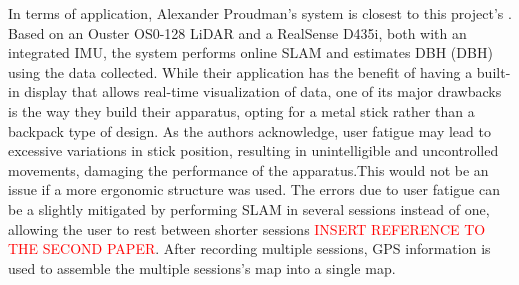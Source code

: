 In terms of application, Alexander Proudman's system is closest to this project's \cite{proudman_online_2021}. Based on an Ouster OS0-128 \acs{LiDAR} and a RealSense D435i, both with an integrated \acs{IMU}, the system performs online \acs{SLAM} and estimates \acl{DBH} (\acs*{DBH}) using the data collected. While their application has the benefit of having a built-in display that allows real-time visualization of data, one of its major drawbacks is the way they build their apparatus, opting for a metal stick rather than a backpack type of design. As the authors acknowledge, user fatigue may lead to excessive variations in stick position, resulting in unintelligible and uncontrolled movements, damaging the performance of the apparatus.This would not be an issue if a more ergonomic structure was used. The errors due to user fatigue can be a slightly mitigated by performing \acs{SLAM} in several sessions instead of one, allowing the user to rest between shorter sessions \textcolor{red}{INSERT REFERENCE TO THE SECOND PAPER}. After recording multiple sessions, \acs*{GPS} information is used to assemble the multiple sessions's map into a single map.